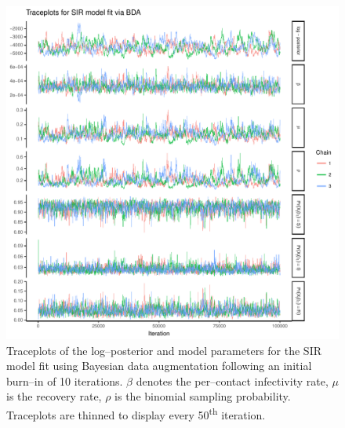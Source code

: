 \begin{figure}[htbp]
	\centering
	\includegraphics[width=0.9\linewidth]{figures/sir_bda_traceplots}
	\caption[Simulation 1 MCMC traceplots for an SIR model fit using Bayesian data augmentation.]{Traceplots of the log--posterior and model parameters for the SIR model fit using Bayesian data augmentation following an initial burn--in of 10 iterations. $ \beta $ denotes the per--contact infectivity rate, $ \mu $ is the recovery rate, $ \rho $ is the binomial sampling probability. Traceplots are thinned to display every 50\textsuperscript{th} iteration.}
	\label{fig:sirbdatraceplots}
\end{figure}


